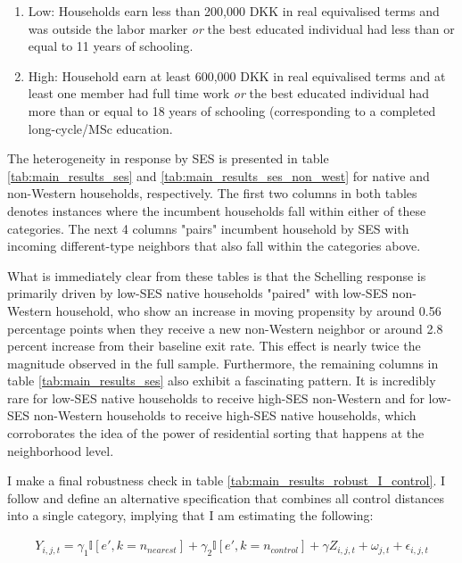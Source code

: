 \documentclass[../main.tex]{subfiles}
\begin{document}
\begin{enumerate}
    \item Low: Households earn less than 200,000 DKK in real equivalised terms and was outside the labor marker \textit{or} the best educated individual had less than or equal to 11 years of schooling.
    \item High: Household earn at least 600,000 DKK in real equivalised terms and at least one member had full time work \textit{or} the best educated individual had more than or equal to 18 years of schooling (corresponding to a completed long-cycle/MSc education.
\end{enumerate}

The heterogeneity in response by SES is presented in table \ref{tab:main_results_ses} and \ref{tab:main_results_ses_non_west} for native and non-Western households, respectively. The first two columns in both tables denotes instances where the incumbent households fall within either of these categories. The next 4 columns "pairs" incumbent household by SES with incoming different-type neighbors that also fall within the categories above. 

What is immediately clear from these tables is that the Schelling response is primarily driven by low-SES native households "paired" with low-SES non-Western household, who show an increase in moving propensity by around 0.56 percentage points when they receive a new non-Western neighbor or around 2.8 percent increase from their baseline exit rate. This effect is nearly twice the magnitude observed in the full sample. Furthermore, the remaining columns in table \ref{tab:main_results_ses} also exhibit a fascinating pattern. It is incredibly rare for low-SES native households to receive high-SES non-Western and for low-SES non-Western households to receive high-SES native households, which corroborates the idea of the power of residential sorting that happens at the neighborhood level. 

I make a final robustness check in table \ref{tab:main_results_robust_I_control}. I follow \textcite{Bayer_2022_nearest_neighbor} and define an alternative specification  that combines all control distances into a single category, implying that I am estimating the following:

\begin{equation}
\begin{split}
    Y_{i, j, t} = \gamma_1 \mathbb{I}[e', k=n_{nearest}] + \gamma_2 \mathbb{I}[e', k = n_{control}] + \gamma Z_{i, j, t} + \omega_{j, t} + \epsilon_{i, j, t}
\label{eq:main_eq_schelling_behavior_I_control}
\end{split}
\end{equation}
\end{document}
